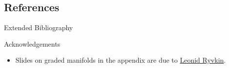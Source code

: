\documentclass[beamer,handout,10pt]{standalone}
\begin{document}


\subsection{References}

\begin{frame}[t,allowframebreaks]{Extended Bibliography}
	
	

	\medspace
	\begin{block}{Acknowledgements}
		\begin{itemize}
			\item Slides on graded manifolds in the appendix are due to \href{ryvkin.eu}{Leonid Ryvkin}.
		\end{itemize}
	\end{block}

\end{frame}




\end{document}
